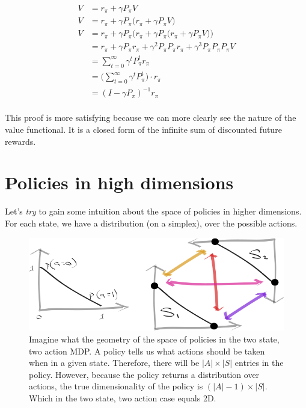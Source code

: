 \begin{align*}
V &= r_{\pi} + \gamma P_{\pi} V \tag{Bellman eqn}\\
V &= r_{\pi} + \gamma P_{\pi}\big( r_{\pi} + \gamma P_{\pi} V\big) \\
V &= r_{\pi} + \gamma P_{\pi}\Big(r_{\pi} + \gamma P_{\pi}\big( r_{\pi} + \gamma P_{\pi} V\big)) \\
&= r_{\pi} + \gamma P_{\pi}r_\pi + \gamma^2 P_{\pi}P_{\pi}r_{\pi} + \gamma^3 P_{\pi}P_{\pi}P_{\pi}V \\
&= \sum_{t=0}^{\infty} \gamma^tP_{\pi}^tr_{\pi} \label{eq:inf-series}\tag{infinite series} \\
&= \big( \sum_{t=0}^{\infty} \gamma^tP_{\pi}^t \big) \cdot r_{\pi}\\
&= (I-\gamma P_{\pi})^{-1} r_{\pi} \tag{value functional}\\
\end{align*}

This proof is more satisfying because we can more clearly see the nature of the value functional. It is a closed form of the infinite sum of discounted future rewards.


\section{Policies in high dimensions}\label{high-D-policies}

Let's \textit{try} to gain some intuition about the space of policies in higher dimensions.
For each state, we have a distribution (on a simplex), over the possible actions.

\begin{figure}[h]
\centering
\includegraphics[width=1\textwidth,height=0.20\textheight]{../../pictures/drawings/2-state-2-action-simplices.png}
\caption{Imagine what the geometry of the space of policies in the two state, two action MDP. A policy tells us what actions should be taken when in a given state. Therefore, there will be \(|A| \times |S|\) entries in the policy. However, because the policy returns a distribution over actions, the true dimensionality of the policy is \((|A| -1) \times |S|\). Which in the two state, two action case equals 2D.}
\end{figure}

